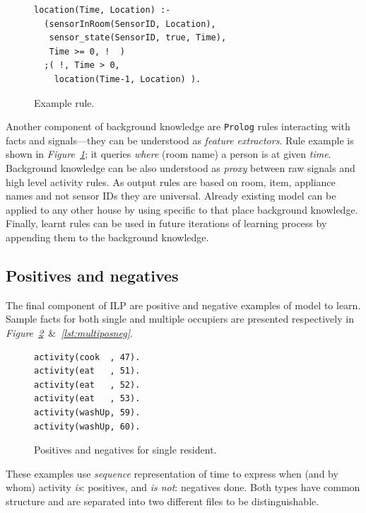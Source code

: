 \documentclass[11pt, a4paper, pdflatex, leqno, twoside, openright]{report}
\begin{document}
\begin{figure}[htb] %
  \begin{verbatim}
location(Time, Location) :-
  (sensorInRoom(SensorID, Location),
   sensor_state(SensorID, true, Time),
   Time >= 0, !  )
  ;( !, Time > 0,
    location(Time-1, Location) ).
  \end{verbatim}
  \caption{Example rule.\label{lst:bg:rule}}
\end{figure}

Another component of background knowledge are \texttt{Prolog} rules interacting with facts and signals---they can be understood as \emph{feature extractors}. Rule example is shown in \emph{Figure~\ref{lst:bg:rule}}; it queries \emph{where} (room name) a person is at given \emph{time}.\\

Background knowledge can be also understood as \emph{proxy} between raw signals and high level activity rules. As output rules are based on room, item, appliance names and not sensor IDs they are universal. Already existing model can be applied to any other house by using specific to that place background knowledge.\\
Finally, learnt rules can be used in future iterations of learning process by appending them to the background knowledge.


    \subsection{Positives and negatives\label{sec:data:posneg}}
The final component of ILP are positive and negative examples of model to learn. Sample facts for both single and multiple occupiers are presented respectively in \emph{Figure~\ref{lst:singleposneg}}~\&~\emph{\ref{lst:multiposneg}}.\\

\begin{figure}[htb] %
  \begin{verbatim}
activity(cook  , 47).
activity(eat   , 51).
activity(eat   , 52).
activity(eat   , 53).
activity(washUp, 59).
activity(washUp, 60).
  \end{verbatim}
  \caption{Positives and negatives for single resident.\label{lst:singleposneg}}
\end{figure}

These examples use \emph{sequence} representation of time to express when (and by whom) activity \emph{is}: positives, and \emph{is not}: negatives done. Both types have common structure and are separated into two different files to be distinguishable.\\
\end{document}
